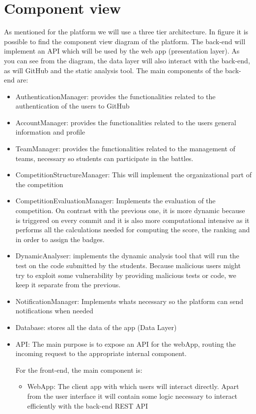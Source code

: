 \section{Component view}
As mentioned for the platform we will use a three tier architecture. In figure  it is possible to find the component view diagram of the platform. The back-end will implement an API which will be used by the web app (presentation layer). As you can see from the diagram, the data layer will also interact with the back-end, as will GitHub and the static analysis tool. The main components of the back-end are:
\begin{itemize}
    \item AuthenticationManager: provides the functionalities related to the authentication of the users to GitHub
    \item AccountManager: provides the functionalities related to the users general information and profile
    \item TeamManager: provides the functionalities related to the management of teams, necessary so students can participate in the battles.
    \item CompetitionStructureManager: This will implement the organizational part of the competition
    \item CompetitionEvaluationManager: Implements the evaluation of the competition. On contrast with the previous one, it is more dynamic because is triggered on every commit and it is also more computational intensive as it performs all the calculations needed for computing the score, the ranking and in order to assign the badges.
    \item DynamicAnalyser: implements the dynamic analysis tool that will run the test on the code submitted by the students. Because malicious users might try to exploit some vulnerability by providing malicious tests or code, we keep it separate from the previous.
    \item NotificationManager: Implements whats necessary so the platform can send notifications when needed
    \item Database: stores all the data of the app (Data Layer)
    \item API: The main purpose is to expose an API for the webApp, routing the incoming request to the appropriate internal component.

    For the front-end, the main component is:
        \begin{itemize}
            \item WebApp: The client app with which users will interact directly. Apart from the user interface it will contain some logic necessary to interact efficiently with the back-end REST API
        \end{itemize}
\end{itemize}

